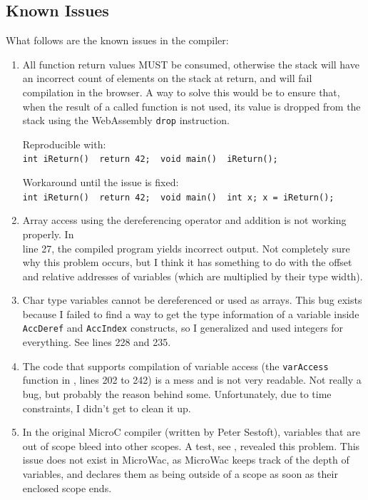 \documentclass[a4paper]{article}
\begin{document}
\subsection{Known Issues}
\label{sec:testing:known-issues}
What follows are the known issues in the compiler:
\begin{enumerate}
	\item All function return values MUST be consumed, otherwise the stack will have an incorrect count of elements on the stack at return, and will fail compilation in the browser. A way to solve this would be to ensure that, when the result of a called function is not used, its value is dropped from the stack using the WebAssembly \texttt{drop} instruction.

	Reproducible with:\\
	\texttt{int iReturn() { return 42; } void main() { iReturn(); }}
	
	Workaround until the issue is fixed:\\
	\texttt{int iReturn() { return 42; } void main() { int x; x = iReturn(); }}

	\item Array access using the dereferencing operator and addition is not working properly. In\\ line 27, the compiled program yields incorrect output. Not completely sure why this problem occurs, but I think it has something to do with the offset and relative addresses of variables (which are multiplied by their type width).

	\item Char type variables cannot be dereferenced or used as arrays. This bug exists because I failed to find a way to get the type information of a variable inside \texttt{AccDeref} and \texttt{AccIndex} constructs, so I generalized and used integers for everything. See  lines 228 and 235.

	\item The code that supports compilation of variable access (the \texttt{varAccess} function in , lines 202 to 242) is a mess and is not very readable. Not really a bug, but probably the reason behind some.  Unfortunately, due to time constraints, I didn't get to clean it up.

	\item In the original MicroC compiler (written by Peter Sestoft), variables that are out of scope bleed into other scopes. A test, see , revealed this problem. This issue does not exist in MicroWac, as MicroWac keeps track of the depth of variables, and declares them as being outside of a scope as soon as their enclosed scope ends.


\end{enumerate}
\end{document}
